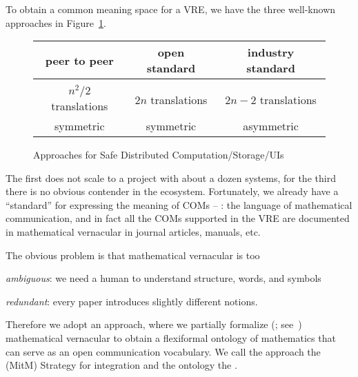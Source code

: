 To obtain a common meaning space for a VRE, we have the three well-known approaches in
Figure~\ref{fig:interop}.
\begin{figure}[ht]\centering
  \begin{tabular}{|c|c|c|}\hline
    peer to peer & open standard & industry standard\\\hline
     &  & \\\hline
    $n^2/2$  translations & $2n$ translations & $2n-2$ translations \\
    symmetric & symmetric & asymmetric\\\hline
  \end{tabular}
  \caption{Approaches for Safe Distributed Computation/Storage/UIs}\label{fig:interop}
\end{figure}

The first does not scale to a project with about a dozen systems, for the third there is
no obvious contender in the \ODK ecosystem. Fortunately, we already have a ``standard'' for
expressing the meaning of COMs -- : the language of
mathematical communication, and in fact all the COMs supported in the \ODK VRE are documented
in mathematical vernacular in journal articles, manuals, etc.

The obvious problem is that mathematical vernacular is too 
\begin{inparaenum}[\em i\rm)]
\item \emph{ambiguous}: we need a human to understand structure, words, and symbols
\item \emph{redundant}: every paper introduces slightly different notions. 
\end{inparaenum}



Therefore we adopt an approach, where we partially formalize (;
see~\cite{Kohlhase:tffm13}) mathematical vernacular to obtain a flexiformal ontology of
mathematics that can serve as an open communication vocabulary. We call the approach the
 (MitM) Strategy for integration and the ontology the .

